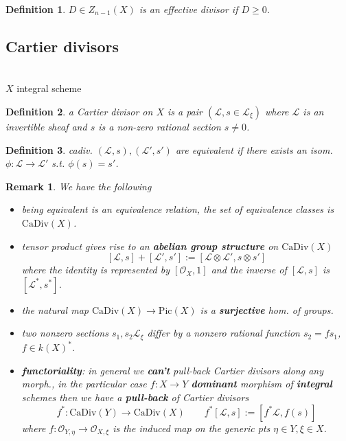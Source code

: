 \documentclass[oneside,a4paper,11pt]{amsbook}
\theoremstyle{pl}
\theoremstyle{df}
\newtheorem*{dfn}{Definition}
\theoremstyle{rm}
\newtheorem{rmk}{Remark}[chapter]
\newcommand{\nline}{
~\\
}%
\newcommand{\pa}[1]{
\left(#1\right)
}
\newcommand{\qa}[1]{
\left[#1\right]
}
\newcommand{\mc}[1]{
\mathcal{#1}
}
\begin{document}
\begin{dfn}
$D\in Z_{n-1}(X)$ is an \emph{effective divisor} if $D\ge 0$. 
\end{dfn}

\subsection{Cartier divisors}
\nline
$X$ integral scheme

\begin{dfn}
a \emph{Cartier divisor} on $X$ is a pair $\pa{\mc{L},s\in\mc{L}_\xi}$ where $\mc{L}$ is an invertible sheaf and $s$ is a non-zero rational section $s\neq 0$.
\end{dfn}

\begin{dfn}
cadiv. $\pa{\mc{L},s},\pa{\mc{L}',s'}$ are \emph{equivalent} if there exists an isom. $\phi:\mc{L}\rightarrow\mc{L}'$ s.t. $\phi(s)=s'$.
\end{dfn}

\begin{rmk}
We have the following
\begin{itemize}
\item{being equivalent is an \emph{equivalence relation}, the set of equivalence classes is $\text{CaDiv}(X)$.}
\item{\emph{tensor product} gives rise to an \textbf{abelian group structure} on $\text{CaDiv}(X)$ 
\[
\qa{\mc{L},s}+\qa{\mc{L}',s'}:=\qa{\mc{L}\otimes\mc{L}',s\otimes s'}
\]
where the identity is represented by $\qa{\mc{O}_X,1}$ and the inverse of $\qa{\mc{L},s}$ is $\qa{\mc{L}^*,s^*}$.}
\item{the natural map $\text{CaDiv}(X)\rightarrow\text{Pic}(X)$ is a \textbf{surjective} hom. of groups.}
\item{two nonzero sections $s_1,s_2\mc{L}_\xi$ differ by a nonzero rational function $s_2=fs_1$, $f\in k(X)^*$.}
\item{\textbf{functoriality}: in general we \textbf{can't} pull-back Cartier divisors along any morph., in the particular case $f:X\rightarrow Y$ \textbf{dominant} morphism of \textbf{integral} schemes then we have a \textbf{pull-back} of Cartier divisors
\[
f^*:\text{CaDiv}(Y)\rightarrow\text{CaDiv}(X)\quad\quad f^*\qa{\mc{L},s}:=\qa{f^*\mc{L},f(s)}
\]
where $f:\mc{O}_{Y,\eta}\rightarrow\mc{O}_{X,\xi}$ is the induced map on the generic pts $\eta\in Y,\xi\in X$.}
\end{itemize}
\end{rmk}
\end{document}
